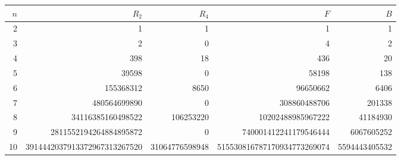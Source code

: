 \begin{tabular}{rrrrr}
\toprule
$n$ & $R_2$ & $R_4$ & $F$ & $B$ \\
\midrule
2 & 1 & 1 & 1 & 1 \\
3 & 2 & 0 & 4 & 2 \\
4 & 398 & 18 & 436 & 20 \\
5 & 39598 & 0 & 58198 & 138 \\
6 & 155368312 & 8650 & 96650662 & 6406 \\
7 & 480564699890 & 0 & 308860488706 & 201338 \\
8 & 34116385160498522 & 106253220 & 10202488985967222 & 41184930 \\
9 & 2811552194264884895872 & 0 & 740001412241179546444 & 6067605252 \\
10 & 3914442037913372967313267520 & 31064776598948 & 515530816787170934773269074 & 5594443405532 \\
\bottomrule
\end{tabular}
